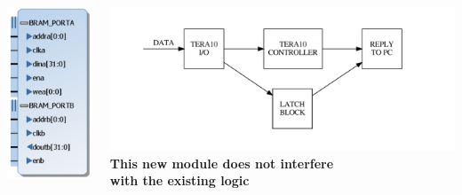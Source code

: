 \documentclass[aspectratio=169]{beamer}
\begin{document}
\begin{frame}
\begin{columns}
\begin{center}
				\includegraphics[width=0.8 \textwidth]{IMG2/LATCH_RAM_IP_2}
			\end{center}
			\begin{center}
				\includegraphics[width=1.0 \textwidth]{IMG2/latch_counter}\\
				\textbf{This new module does not interfere\\with the existing logic}
			\end{center}
		\end{columns}
	\end{frame}
\end{document}
